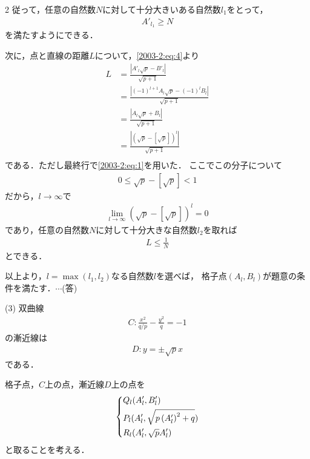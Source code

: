 \documentclass[../../../../main.tex]{subfiles}
\begin{document}
\begin{multicols}{2}
  従って，任意の自然数$N$に対して十分大きいある自然数$l_1$をとって，
  \begin{align*}
    A'_{l_1} \ge N
  \end{align*}
  を満たすようにできる．

  次に，点と直線の距離$L$について，\cref{2003-2:eq:4}より
  \begin{align*}
    L
     & =\frac{\left|A'_{l}\sqrt{p}-B'_{l}\right|}{\sqrt{p+1}}                             \\
     & =\frac{\left|(-1)^{l+1}A_{l}\sqrt{p}-(-1)^{l}B_{l}\right|}{\sqrt{p+1}}             \\
     & =\frac{\left|A_{l}\sqrt{p}+B_{l}\right|}{\sqrt{p+1}}                               \\
     & =\frac{\left|\left(\sqrt{p} - \left[\sqrt{p}\right]\right)^{l}\right|}{\sqrt{p+1}} \\
  \end{align*}
  である．ただし最終行で\cref{2003-2:eq:1}を用いた．
  ここでこの分子について
  \begin{align*}
    0 \le \sqrt{p} - \left[\sqrt{p}\right] < 1
  \end{align*}
  だから，$l\to\infty$で
  \begin{align*}
    \lim_{l\to\infty}\left(\sqrt{p} - \left[\sqrt{p}\right]\right)^{l} = 0
  \end{align*}
  であり，任意の自然数$N$に対して十分大きな自然数$l_2$を取れば
  \begin{align*}
    L \le \frac{1}{N}
  \end{align*}
  とできる．

  以上より，$l=\max(l_1,l_2)$なる自然数$l$を選べば，
  格子点$(A_{l},B_{l})$が題意の条件を満たす．$\cdots$(答)

  \vspace{10pt}
  (3)
  双曲線
  \begin{align*}
    C: \frac{x^{2}}{q/p} - \frac{y^{2}}{q} = -1
  \end{align*}
  の漸近線は
  \begin{align*}
    D: y = \pm\sqrt{p}x
  \end{align*}
  である．

  格子点，$C$上の点，漸近線$D$上の点を
  \begin{align*}
    \begin{dcases}
      Q_l(A'_{l},B'_{l})                                \\
      P_{l}(A'_{l}, \sqrt{p \left(A'_{l}\right)^{2}+q}) \\
      R_{l}(A'_{l}, \sqrt{p} A'_{l})
    \end{dcases}
  \end{align*}
  と取ることを考える．


\end{multicols}
\end{document}
